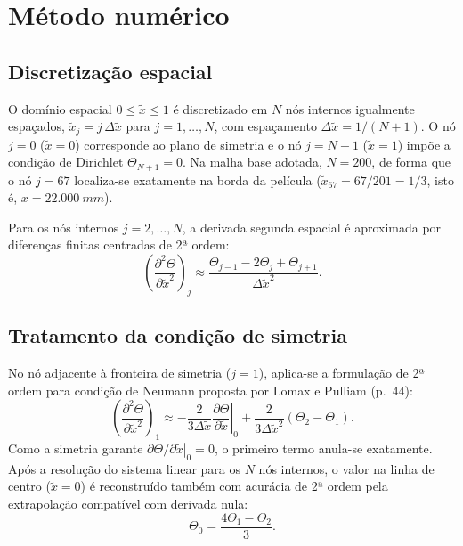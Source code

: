 \documentclass[11pt,a4paper]{article}
\begin{document}
\section{Método numérico}

\subsection{Discretização espacial}
O domínio espacial $0 \le \tilde{x} \le 1$ é discretizado em $N$ nós internos igualmente espaçados, $\tilde{x}_j = j\,\Delta\tilde{x}$ para $j = 1, \dots, N$, com espaçamento $\Delta\tilde{x} = 1/(N+1)$. O nó $j = 0$ ($\tilde{x} = 0$) corresponde ao plano de simetria e o nó $j = N+1$ ($\tilde{x} = 1$) impõe a condição de Dirichlet $\Theta_{N+1} = 0$. Na malha base adotada, $N = 200$, de forma que o nó $j = 67$ localiza-se exatamente na borda da película ($\tilde{x}_{67} = 67/201 = 1/3$, isto é, $x = \SI{22,000}{mm}$).

Para os nós internos $j = 2, \dots, N$, a derivada segunda espacial é aproximada por diferenças finitas centradas de 2ª ordem:
\begin{equation}
    \left(\frac{\partial^2\Theta}{\partial\tilde{x}^2}\right)_j \approx \frac{\Theta_{j-1} - 2\Theta_j + \Theta_{j+1}}{\Delta\tilde{x}^2}.
    \label{eq:df_interna}
\end{equation}

\subsection{Tratamento da condição de simetria}
No nó adjacente à fronteira de simetria ($j = 1$), aplica-se a formulação de 2ª ordem para condição de Neumann proposta por Lomax e Pulliam (p.~44):
\begin{equation}
    \left(\frac{\partial^2\Theta}{\partial\tilde{x}^2}\right)_1 \approx -\frac{2}{3\Delta\tilde{x}}\left.\frac{\partial\Theta}{\partial\tilde{x}}\right|_0 + \frac{2}{3\Delta\tilde{x}^2}(\Theta_2 - \Theta_1).
    \label{eq:lomax}
\end{equation}
Como a simetria garante $\left.\partial\Theta/\partial\tilde{x}\right|_0 = 0$, o primeiro termo anula-se exatamente. Após a resolução do sistema linear para os $N$ nós internos, o valor na linha de centro ($\tilde{x} = 0$) é reconstruído também com acurácia de 2ª ordem pela extrapolação compatível com derivada nula:
\begin{equation}
    \Theta_0 = \frac{4\Theta_1 - \Theta_2}{3}.
    \label{eq:reconstrucao_centro}
\end{equation}
\end{document}
